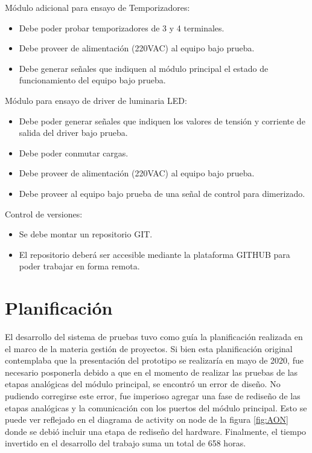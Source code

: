 Módulo adicional para ensayo de Temporizadores:

\begin{itemize}
	\item Debe poder probar temporizadores de 3 y 4 terminales.
	\item Debe proveer de alimentación (220VAC) al equipo bajo prueba.
	\item Debe generar señales que indiquen al módulo principal el estado de funcionamiento del equipo bajo prueba. 
	
\end{itemize}

Módulo para ensayo de driver de luminaria LED:

\begin{itemize}
	\item Debe poder generar señales que indiquen los valores de tensión y corriente de salida del driver bajo prueba.
	\item Debe poder conmutar cargas.
	\item Debe proveer de alimentación (220VAC) al equipo bajo prueba.
	\item Debe proveer al equipo bajo prueba de una señal de control para dimerizado.
\end{itemize}

Control de versiones:

\begin{itemize}
	\item Se debe montar un repositorio GIT.
	\item El repositorio deberá ser accesible mediante la plataforma GITHUB para poder trabajar en forma remota.
\end{itemize}

\section{Planificación}
El desarrollo del sistema de pruebas tuvo como guía la planificación realizada en el marco de la materia gestión de proyectos. Si bien esta planificación original contemplaba que la presentación del prototipo se realizaría en mayo de 2020, fue necesario posponerla debido a que en el momento de realizar las pruebas de las etapas analógicas del módulo principal, se encontró un error de diseño. No pudiendo corregirse este error, fue imperioso agregar una fase de rediseño de las etapas analógicas y la comunicación con los puertos del módulo principal. Esto se puede ver reflejado en el diagrama de activity on node de la figura \ref{fig:AON} donde se debió incluir una etapa de rediseño del hardware. 
Finalmente, el tiempo invertido en el desarrollo del trabajo suma un total de 658 horas.

